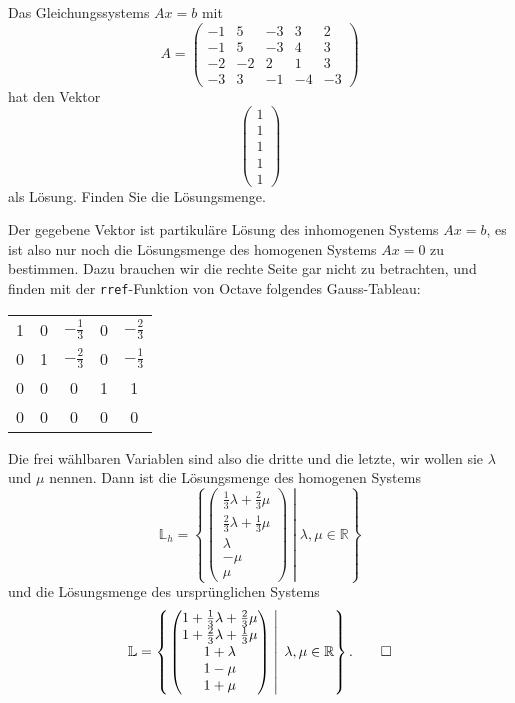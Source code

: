 Das Gleichungssystems $Ax=b$ mit
\[
A=\begin{pmatrix}
-1& 5&-3& 3& 2\\
-1& 5&-3& 4& 3\\
-2&-2& 2& 1& 3\\
-3& 3&-1&-4&-3
\end{pmatrix}
\]
hat den Vektor
\[
\begin{pmatrix}1\\1\\1\\1\\1\end{pmatrix}
\]
als Lösung.
Finden Sie die Lösungsmenge.

\begin{loesung}
Der gegebene Vektor ist partikuläre Lösung des inhomogenen Systems
$Ax=b$, es ist also nur noch die Lösungsmenge des homogenen Systems
$Ax=0$ zu bestimmen.
Dazu brauchen wir die rechte Seite gar nicht zu betrachten,
und finden mit der {\tt rref}-Funktion von Octave folgendes Gauss-Tableau:
\begin{center}
\begin{tabular}{|ccccc|}
\hline
1&0&$-\frac13$&0&$-\frac23$\\
0&1&$-\frac23$&0&$-\frac13$\\
0&0&         0&1&1\\
0&0&         0&0&0\\
\hline
\end{tabular}
\end{center}
Die frei wählbaren Variablen sind also die dritte und die letzte,
wir wollen sie $\lambda$ und $\mu$ nennen. Dann ist die Lösungsmenge
des homogenen Systems
\[
{\mathbb L}_h
=
\left\{
\left.
\begin{pmatrix}
\frac13\lambda+\frac23\mu\\
\frac23\lambda+\frac13\mu\\
\lambda\\
-\mu\\
\mu
\end{pmatrix}
\;
\right|
\;
\lambda,\mu\in\mathbb R
\right\}
\]
und die Lösungsmenge des ursprünglichen Systems
\[
{\mathbb L}
=
\left\{
\left.
\begin{pmatrix}
1+\frac13\lambda+\frac23\mu\\
1+\frac23\lambda+\frac13\mu\\
1+\lambda\\
1-\mu\\
1+\mu
\end{pmatrix}
\;
\right|
\;
\lambda,\mu\in\mathbb R
\right\}.
\qedhere
\]
\end{loesung}
